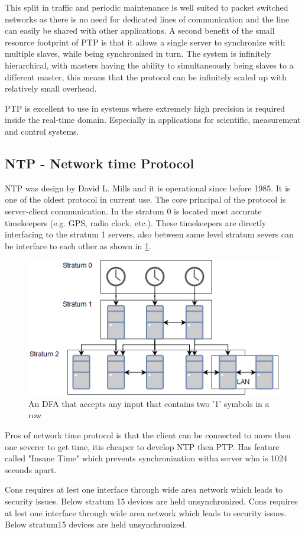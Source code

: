 \noindent This split in traffic and periodic maintenance is well suited to packet switched networks as there is no need for dedicated lines of communication and the line can easily be shared with other applications. A second benefit of the small resource footprint of PTP is that it allows a single server to synchronize with multiple slaves, while being synchronized in turn. The system is infinitely hierarchical, with masters having the ability to simultaneously being slaves to a different master, this means that the protocol can be infinitely scaled up with relatively small overhead.

\noindent PTP is excellent to use in systems where extremely high precision is required  inside the real-time domain. Especially in applications for scientific, measurement and control systems.

\subsection{NTP - Network time Protocol}

NTP was design by David L. Mills and it is operational since before 1985. It is one of the oldest protocol in
current use. The core principal of the protocol is server-client communication. In the stratum 0 is located
most accurate timekeepers (e.g. GPS, radio clock, etc.). These timekeepers are directly interfacing to the
stratum 1 servers, also between same level stratum severs can be interface to each other as shown in \ref{fig:NTP}.

\begin{figure}[H]\label{}
	\centering
	\includegraphics[scale=0.4]{synchronization/fig/NTP.png}
	\caption{An DFA that accepts any input that contains two '1' symbols in a row}
	\label{fig:NTP}
\end{figure}

\noindent Pros of network time protocol is that the client can be connected to more then one severer to get time, itis cheaper to develop NTP then PTP. Has feature called "Insane Time" which prevents synchronization witha server who is 1024 seconds apart.

\noindent Cons requires at lest one interface through wide area network which leads to security issues. Below stratum
15 devices are held unsynchronized.
Cons requires at lest one interface through wide area network which leads to security issues. Below stratum15 devices are held unsynchronized.
